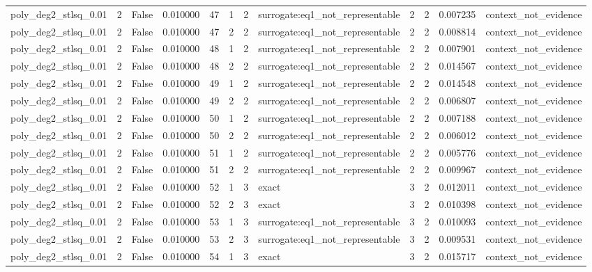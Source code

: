 \begin{tabular}{lrrrrrrlrrrl}
poly\_deg2\_stlsq\_0.01 & 2 & False & 0.010000 & 47 & 1 & 2 & surrogate:eq1\_not\_representable & 2 & 2 & 0.007235 & context\_not\_evidence \\
poly\_deg2\_stlsq\_0.01 & 2 & False & 0.010000 & 47 & 2 & 2 & surrogate:eq1\_not\_representable & 2 & 2 & 0.008814 & context\_not\_evidence \\
poly\_deg2\_stlsq\_0.01 & 2 & False & 0.010000 & 48 & 1 & 2 & surrogate:eq1\_not\_representable & 2 & 2 & 0.007901 & context\_not\_evidence \\
poly\_deg2\_stlsq\_0.01 & 2 & False & 0.010000 & 48 & 2 & 2 & surrogate:eq1\_not\_representable & 2 & 2 & 0.014567 & context\_not\_evidence \\
poly\_deg2\_stlsq\_0.01 & 2 & False & 0.010000 & 49 & 1 & 2 & surrogate:eq1\_not\_representable & 2 & 2 & 0.014548 & context\_not\_evidence \\
poly\_deg2\_stlsq\_0.01 & 2 & False & 0.010000 & 49 & 2 & 2 & surrogate:eq1\_not\_representable & 2 & 2 & 0.006807 & context\_not\_evidence \\
poly\_deg2\_stlsq\_0.01 & 2 & False & 0.010000 & 50 & 1 & 2 & surrogate:eq1\_not\_representable & 2 & 2 & 0.007188 & context\_not\_evidence \\
poly\_deg2\_stlsq\_0.01 & 2 & False & 0.010000 & 50 & 2 & 2 & surrogate:eq1\_not\_representable & 2 & 2 & 0.006012 & context\_not\_evidence \\
poly\_deg2\_stlsq\_0.01 & 2 & False & 0.010000 & 51 & 1 & 2 & surrogate:eq1\_not\_representable & 2 & 2 & 0.005776 & context\_not\_evidence \\
poly\_deg2\_stlsq\_0.01 & 2 & False & 0.010000 & 51 & 2 & 2 & surrogate:eq1\_not\_representable & 2 & 2 & 0.009967 & context\_not\_evidence \\
poly\_deg2\_stlsq\_0.01 & 2 & False & 0.010000 & 52 & 1 & 3 & exact & 3 & 2 & 0.012011 & context\_not\_evidence \\
poly\_deg2\_stlsq\_0.01 & 2 & False & 0.010000 & 52 & 2 & 3 & exact & 3 & 2 & 0.010398 & context\_not\_evidence \\
poly\_deg2\_stlsq\_0.01 & 2 & False & 0.010000 & 53 & 1 & 3 & surrogate:eq1\_not\_representable & 3 & 2 & 0.010093 & context\_not\_evidence \\
poly\_deg2\_stlsq\_0.01 & 2 & False & 0.010000 & 53 & 2 & 3 & surrogate:eq1\_not\_representable & 3 & 2 & 0.009531 & context\_not\_evidence \\
poly\_deg2\_stlsq\_0.01 & 2 & False & 0.010000 & 54 & 1 & 3 & exact & 3 & 2 & 0.015717 & context\_not\_evidence \\

\end{tabular}
